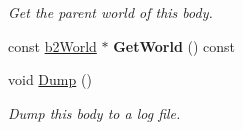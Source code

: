\begin{DoxyCompactItemize}
\begin{DoxyCompactList}\small\item\em Get the parent world of this body. \end{DoxyCompactList}\item 
\hypertarget{classb2_body_aee495ab2131b3123e0cfc5ed106b2fda}{const \hyperlink{classb2_world}{b2\-World} $\ast$ {\bfseries Get\-World} () const }\label{classb2_body_aee495ab2131b3123e0cfc5ed106b2fda}

\item 
\hypertarget{classb2_body_ac9e482f7d9df92801c24e79a7e751d06}{void \hyperlink{classb2_body_ac9e482f7d9df92801c24e79a7e751d06}{Dump} ()}\label{classb2_body_ac9e482f7d9df92801c24e79a7e751d06}

\begin{DoxyCompactList}\small\item\em Dump this body to a log file. \end{DoxyCompactList}\end{DoxyCompactItemize}
